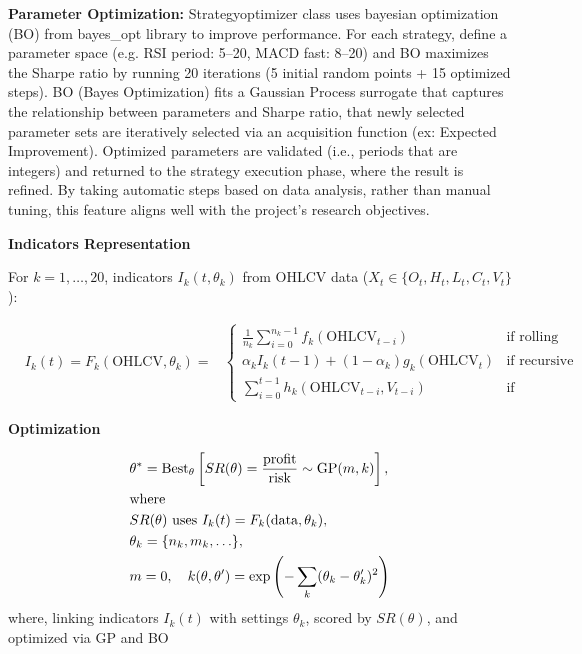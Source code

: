 \textbf{Parameter Optimization: }
Strategyoptimizer class uses bayesian optimization (BO) from bayes\_opt library to improve performance. For each strategy, define a parameter space (e.g. RSI period: 5–20, MACD fast: 8–20) and BO maximizes the Sharpe ratio by running 20 iterations (5 initial random points + 15 optimized steps). BO (Bayes Optimization) fits a Gaussian Process surrogate that captures the relationship between parameters and Sharpe ratio, that newly selected parameter sets are iteratively selected via an acquisition function (ex: Expected Improvement). Optimized parameters are validated (i.e., periods that are integers) and returned to the strategy execution phase, where the result is refined. By taking automatic steps based on data analysis, rather than manual tuning, this feature aligns well with the project’s research objectives.

\textbf{Indicators Representation}

For \( k = 1, \ldots, 20 \), indicators \( I_k(t, \theta_k) \) from OHLCV data (\( X_t \in \{O_t, H_t, L_t, C_t, V_t\} \)):

\begin{align}
&I_k(t) = F_k(\text{OHLCV}, \theta_k) = 
&\begin{cases}
\frac{1}{n_k} \sum_{i=0}^{n_k-1} f_k(\text{OHLCV}_{t-i}) & \text{if rolling} \\
\alpha_k I_k(t-1) + (1 - \alpha_k) g_k(\text{OHLCV}_t) & \text{if recursive} \\
\sum_{i=0}^{t-1} h_k(\text{OHLCV}_{t-i}, V_{t-i}) & \text{if cumulative}
\end{cases}
\end{align}

\textbf{Optimization}

\begin{align}
&\theta^* = \text{Best}_\theta \left[ SR(\theta) = \frac{\text{profit}}{\text{risk}} \sim \text{GP}(m, k) \right], \\
&\text{where} \notag \\
&SR(\theta) \text{ uses } I_k(t) = F_k(\text{data}, \theta_k), \\
&\theta_k = \{ n_k, m_k, \ldots \}, \\
&m = 0, \quad k(\theta, \theta') = \exp\left(-\sum_{k} (\theta_k - \theta_k')^2\right)
\end{align}
where, linking indicators \( I_k(t) \) with settings \( \theta_k \), scored by \( SR(\theta) \), and optimized via GP and BO


